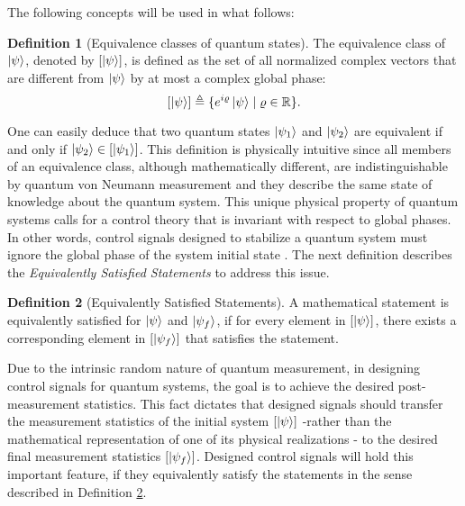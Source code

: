 \documentclass[journal]{IEEEtran}
\theoremstyle{definition}
\newtheorem{defn}{Definition}
\begin{document}
The following concepts will be used in what follows:
\begin{defn}[Equivalence classes of quantum states]
The equivalence class of $\ket{\psi}$, denoted by $[\ket{\psi}]$, is defined as the set of all normalized complex vectors that are different from $\ket{\psi}$ by at most a complex global phase:
$$[\ket{\psi}]\triangleq \{e^{i\varrho}\ket{\psi}\mid\varrho\in\mathbb{R}\}. $$
\end{defn}

One can easily deduce that two quantum states $\ket{\psi_1}$ and $\ket{\psi_2}$ are equivalent if and only if $\ket{\psi_2}\in[\ket{\psi_1}]$. 
This definition is physically intuitive since all members of an equivalence class, although mathematically different, are indistinguishable by quantum von Neumann measurement and they describe the same state of knowledge about the quantum system. This unique physical property of quantum systems calls for a control theory that is invariant with respect to global phases. In other words, control signals designed to stabilize a quantum system must ignore the global phase of the system initial state \cite{azodi2017lyapunov}. The next definition describes the  \textit{Equivalently Satisfied Statements} to address this issue. 
\begin{defn}[Equivalently Satisfied Statements]\label{equiv}
A mathematical statement is equivalently satisfied for $\ket{\psi}$ and $\ket{\psi_f}$, if for every element in $[\ket{\psi}]$, there exists a corresponding element in $[\ket{\psi_f}]$ that satisfies the statement.  
\end{defn}

Due to the intrinsic random nature of quantum measurement, in designing control signals for quantum systems, the goal is to achieve the desired post-measurement statistics. This fact dictates that designed signals should transfer the measurement statistics of the initial system $[\ket{\psi}]$ -rather than the mathematical representation of one of its physical realizations - to the desired final measurement statistics $[\ket{\psi_f}]$. Designed control signals will hold this important feature, if they equivalently satisfy the statements in the sense described in Definition \ref{equiv}.
\end{document}
